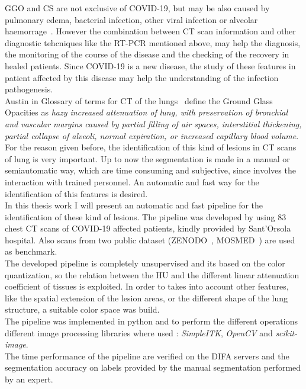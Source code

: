 \documentclass{standalone}
\begin{document}
GGO and CS are not exclusive of COVID-19, but may be also caused by pulmonary edema, bacterial infection, other viral infection or alveolar haemorrage~\cite{ART:Collins}. However the combination between CT scan information and other diagnostic tehcniques like the RT-PCR mentioned above, may help the diagnosis, the monitoring of the course of the disease and the checking of the recovery in healed patients. Since COVID-19 is a new disease, the study of these features in patient affected by this disease may help the understanding of the infection pathogenesis.\\
Austin in Glossary of terms for CT of the lungs~\cite{ART:Austin} define the Ground Glass Opacities as \emph{hazy increased attenuation of lung, with preservation of bronchial and vascular margins caused by partial filling of air spaces, interstitial thickening, partial collapse of alveoli, normal expiration, or increased capillary blood volume}.
For the reason given before, the identification of this kind of lesions in CT scans of lung is very important. Up to now the segmentation is made in a manual or semiautomatic way, which are time consuming and subjective, since involves the interaction with trained personnel. An automatic and fast way for the identification of this features is desired.\\
In this thesis work I will present an automatic and fast pipeline for the identification of these kind of lesions. The pipeline was developed by using $83$ chest CT scans of COVID-19 affected patients, kindly provided by Sant'Orsola hospital. Also scans from two public dataset (ZENODO~\cite{DATA:ZENODO}, MOSMED~\cite{DATA:MOSMED}) are used as benchmark.\\
The developed pipeline is completely unsupervised and its based on the color quantization, so the relation between the HU and the different linear attenuation coefficient of tissues is exploited. In order to takes into account other features, like the spatial extension of the lesion areas, or the different shape of the lung structure, a suitable color space was build.\\
The pipeline was implemented in python and to perform the different operations different image processing libraries where used : \emph{SimpleITK}, \emph{OpenCV} and \emph{scikit-image}.\\
The time performance of the pipeline are verified on the DIFA servers and the segmentation accuracy on labels provided by the manual segmentation performed by an expert.
\end{document}
